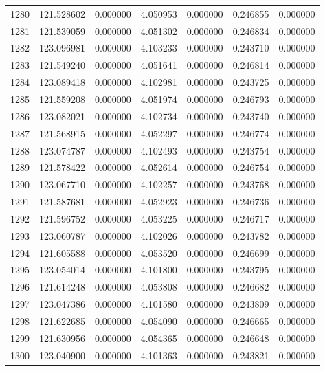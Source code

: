 \begin{tabular}{rrrrrrr}
1280 & 121.528602 &    0.000000 &  4.050953 &    0.000000 &    0.246855 &  0.000000 \\
1281 & 121.539059 &    0.000000 &  4.051302 &    0.000000 &    0.246834 &  0.000000 \\
1282 & 123.096981 &    0.000000 &  4.103233 &    0.000000 &    0.243710 &  0.000000 \\
1283 & 121.549240 &    0.000000 &  4.051641 &    0.000000 &    0.246814 &  0.000000 \\
1284 & 123.089418 &    0.000000 &  4.102981 &    0.000000 &    0.243725 &  0.000000 \\
1285 & 121.559208 &    0.000000 &  4.051974 &    0.000000 &    0.246793 &  0.000000 \\
1286 & 123.082021 &    0.000000 &  4.102734 &    0.000000 &    0.243740 &  0.000000 \\
1287 & 121.568915 &    0.000000 &  4.052297 &    0.000000 &    0.246774 &  0.000000 \\
1288 & 123.074787 &    0.000000 &  4.102493 &    0.000000 &    0.243754 &  0.000000 \\
1289 & 121.578422 &    0.000000 &  4.052614 &    0.000000 &    0.246754 &  0.000000 \\
1290 & 123.067710 &    0.000000 &  4.102257 &    0.000000 &    0.243768 &  0.000000 \\
1291 & 121.587681 &    0.000000 &  4.052923 &    0.000000 &    0.246736 &  0.000000 \\
1292 & 121.596752 &    0.000000 &  4.053225 &    0.000000 &    0.246717 &  0.000000 \\
1293 & 123.060787 &    0.000000 &  4.102026 &    0.000000 &    0.243782 &  0.000000 \\
1294 & 121.605588 &    0.000000 &  4.053520 &    0.000000 &    0.246699 &  0.000000 \\
1295 & 123.054014 &    0.000000 &  4.101800 &    0.000000 &    0.243795 &  0.000000 \\
1296 & 121.614248 &    0.000000 &  4.053808 &    0.000000 &    0.246682 &  0.000000 \\
1297 & 123.047386 &    0.000000 &  4.101580 &    0.000000 &    0.243809 &  0.000000 \\
1298 & 121.622685 &    0.000000 &  4.054090 &    0.000000 &    0.246665 &  0.000000 \\
1299 & 121.630956 &    0.000000 &  4.054365 &    0.000000 &    0.246648 &  0.000000 \\
1300 & 123.040900 &    0.000000 &  4.101363 &    0.000000 &    0.243821 &  0.000000 \\

\end{tabular}
